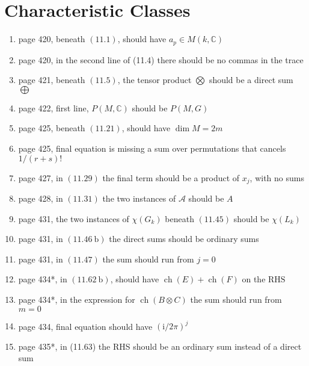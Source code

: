 \documentclass{article}
\begin{document}
\section*{Characteristic Classes}
\begin{enumerate}
\item page 420, beneath $(11.1)$, should have $a_{p} \in M(k, \mathbb{C})$

\item page 420, in the second line of (11.4) there should be no commas in the trace

\item page 421, beneath $(11.5)$, the tensor product $\bigotimes$ should be a direct sum $\bigoplus$

\item page 422, first line, $P(M, \mathbb{C})$ should be $P(M, G)$

\item page 425, beneath $(11.21)$, should have $\operatorname{dim} M=2 m$

\item page 425, final equation is missing a sum over permutations that cancels $1 /(r+s)!$

\item page 427, in $(11.29)$ the final term should be a product of $x_{j}$, with no sums

\item page 428, in $(11.31)$ the two instances of $\mathcal{A}$ should be $A$

\item page 431, the two instances of $\chi\left(G_{k}\right)$ beneath $(11.45)$ should be $\chi\left(L_{k}\right)$

\item page 431, in $(11.46 \mathrm{~b})$ the direct sums should be ordinary sums

\item page 431, in $(11.47)$ the sum should run from $j=0$

\item page 434*, in $(11.62 \mathrm{~b})$, should have $\operatorname{ch}(E)+\operatorname{ch}(F)$ on the $\mathrm{RHS}$

\item page 434*, in the expression for $\operatorname{ch}(B \otimes C)$ the sum should run from $m=0$

\item page 434, final equation should have $(\mathrm{i} / 2 \pi)^{j}$

\item page 435*, in (11.63) the RHS should be an ordinary sum instead of a direct sum


\end{enumerate}
\end{document}
